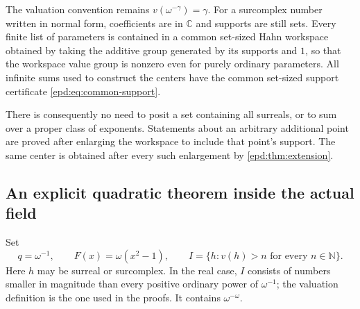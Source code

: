 \documentclass[11pt,a4paper]{article}
\numberwithin{equation}{section}
\theoremstyle{plain}
\theoremstyle{definition}
\theoremstyle{remark}
\newcommand{\C}{\mathbb C}
\newcommand{\N}{\mathbb N}
\begin{document}
The valuation convention remains $v(\omega^{-\gamma})=\gamma$.
For a surcomplex number written in normal form, coefficients are in
$\C$ and supports are still sets. Every finite list of parameters is
contained in a common set-sized Hahn workspace obtained by taking the
additive group generated by its supports and $1$, so that the workspace
value group is nonzero even for purely ordinary parameters. All infinite sums used to
construct the centers have the common set-sized support certificate
\eqref{epd:eq:common-support}.

There is consequently no need to posit a set containing all surreals,
or to sum over a proper class of exponents. Statements about an
arbitrary additional point are proved after enlarging the workspace to
include that point's support. The same center is obtained after every
such enlargement by \cref{epd:thm:extension}.

\subsection{An explicit quadratic theorem inside the actual field}
Set
\begin{equation}\label{epd:eq:surreal-F}
 q=\omega^{-1},\qquad F(x)=\omega(x^2-1),\qquad
 I=\{h:v(h)>n\text{ for every }n\in\N\}.
\end{equation}
Here $h$ may be surreal or surcomplex. In the real case, $I$ consists
of numbers smaller in magnitude than every positive ordinary power
of $\omega^{-1}$; the valuation definition is the one used in the
proofs. It contains $\omega^{-\omega}$.
\end{document}
